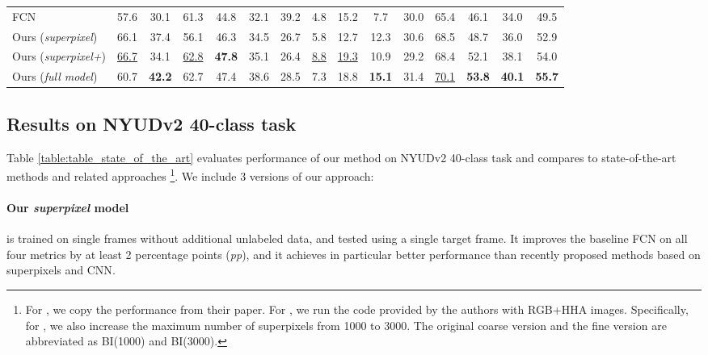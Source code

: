 \begin{table*}[t!]
\begin{center}
\begin{tabular}{lcccccccccccccc}
      FCN  \cite{long2015fully}  & 57.6  & 30.1  & 61.3  & 44.8  & 32.1  & {39.2}  & 4.8  & 15.2  & 7.7  & {30.0}  & 65.4  & 46.1 & 34.0  & 49.5  \\
      \cmidrule(lr){1-1}\cmidrule(lr){2-11}\cmidrule(lr){12-15}
      Ours (\textit{superpixel}) & 66.1  & {37.4}  & 56.1  & 46.3  & 34.5  & 26.7  & 5.8  & 12.7  & 12.3  & 30.6  & {68.5}  & {48.7} & {36.0}  & {52.9} \\
      Ours (\textit{superpixel+}) & \underline{66.7}  & {34.1}  & \underline{62.8}  & \textbf{47.8}  & {35.1}  & 26.4  & \underline{8.8}  & \underline{19.3}  & {10.9}  & {29.2}  & {68.4}  & {52.1} & {38.1}  & {54.0} \\
      Ours (\textit{full model}) & {60.7}  & \textbf{42.2}  & {62.7}  & {47.4}  & {38.6}  & {28.5}  & {7.3}  & {18.8}  & \textbf{15.1}  & {31.4}  & \underline{70.1}  & \textbf{53.8} & \textbf{40.1}  & \textbf{55.7} \\
     \bottomrule
    \end{tabular}
  \end{center}
\end{table*}

\subsection{Results on NYUDv2 40-class task}
Table \ref{table:table_state_of_the_art} evaluates performance of our method on NYUDv2 40-class task
and compares to state-of-the-art methods and related approaches \cite{long2015fully,deng2015semantic,gupta2014learning,alex2015bayesiansegnet,david2015multiscale,crfasrnn_iccv2015,chen2014semantic,chen2016deeplab,raghudeep2015spCNN,region_end2end2016eccv}
\footnote{For \cite{long2015fully,deng2015semantic, gupta2014learning, alex2015bayesiansegnet, david2015multiscale}, we copy the performance from their paper. For \cite{crfasrnn_iccv2015,chen2014semantic,chen2016deeplab,raghudeep2015spCNN,region_end2end2016eccv}, we run the code provided by the authors with RGB+HHA images.
Specifically, for \cite{raghudeep2015spCNN}, we also increase the maximum number of superpixels from 1000 to 3000. The original coarse version and the fine version are abbreviated as BI(1000) and BI(3000).
}.
We include 3 versions of our approach:

\paragraph{Our \textit{superpixel} model} is trained on single frames without additional unlabeled data, and tested using a single target frame. It improves the baseline FCN on all four metrics by at least 2 percentage points (\textit{pp}),
and it achieves in particular better performance than recently proposed methods based on superpixels and CNN\cite{raghudeep2015spCNN,region_end2end2016eccv}.
